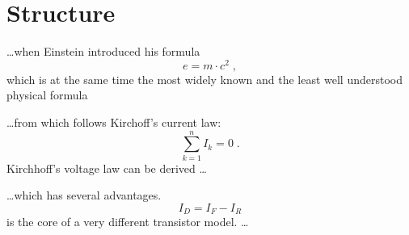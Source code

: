 \documentclass[a4paper, 11pt]{article}
\begin{document}
\section{Structure}
    \ldots when Einstein introduced his formula
    \begin{equation}
        e = m \cdot c^2 \; ,
    \end{equation}
    which is at the same time the most widely known 
    and the least well understood physical formula

    
    \ldots from which follows Kirchoff's current law:
    \begin{equation}
        \sum_{k=1}^{n} I_k = 0 \; .
    \end{equation}
    Kirchhoff's voltage law can be derived \ldots

    \ldots which has several advantages.
    \begin{equation}
        I_D = I_F - I_R
    \end{equation}
    is the core of a very different transistor model. \ldots

\section{}
\end{document}

